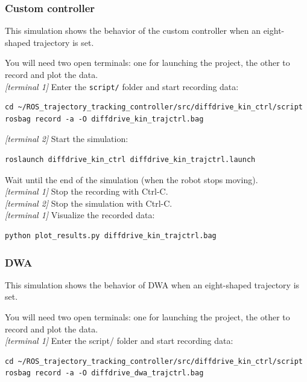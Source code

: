 \documentclass[11pt,a4paper]{article}
\begin{document}
\subsubsection{Custom controller}

This simulation shows the behavior of the custom controller when an eight-shaped trajectory is set.

You will need two open terminals: one for launching the project, the other to record and plot the data.\\

\textit{[terminal 1]} Enter the \texttt{script/} folder and start recording data:
\begin{lstlisting}
cd ~/ROS_trajectory_tracking_controller/src/diffdrive_kin_ctrl/script
rosbag record -a -O diffdrive_kin_trajctrl.bag
\end{lstlisting}

\textit{[terminal 2]} Start the simulation:
\begin{lstlisting}
roslaunch diffdrive_kin_ctrl diffdrive_kin_trajctrl.launch
\end{lstlisting}

Wait until the end of the simulation (when the robot stops moving).\\

\textit{[terminal 1]} Stop the recording with Ctrl-C.\\

\textit{[terminal 2]} Stop the simulation with Ctrl-C.\\

\textit{[terminal 1]} Visualize the recorded data:
\begin{lstlisting}
python plot_results.py diffdrive_kin_trajctrl.bag
\end{lstlisting}

\subsubsection{DWA}

This simulation shows the behavior of DWA when an eight-shaped trajectory is set.

You will need two open terminals: one for launching the project, the other to record and plot the data.\\

\textit{[terminal 1]} Enter the script/ folder and start recording data:
\begin{lstlisting}
cd ~/ROS_trajectory_tracking_controller/src/diffdrive_kin_ctrl/script
rosbag record -a -O diffdrive_dwa_trajctrl.bag
\end{lstlisting}
\end{document}
